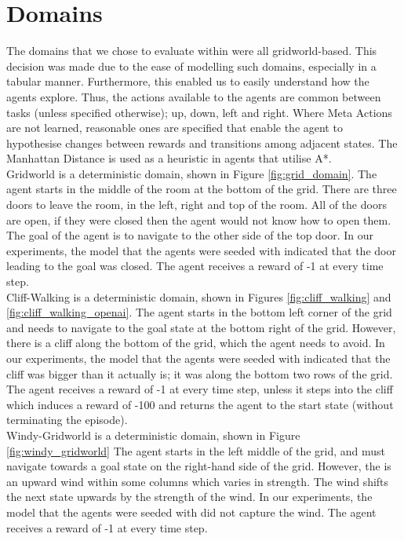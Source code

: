 \section{Domains}
The domains that we chose to evaluate within were all gridworld-based. This decision was made due to the ease of modelling such domains, especially in a tabular manner. Furthermore, this enabled us to easily understand how the agents explore. Thus, the actions available to the agents are common between tasks (unless specified otherwise); up, down, left and right. Where Meta Actions are not learned, reasonable ones are specified that enable the agent to hypothesise changes between rewards and transitions among adjacent states. The Manhattan Distance \cite{krause1973taxicab} is used as a heuristic in agents that utilise A*.
\\Gridworld is a deterministic domain, shown in Figure \ref{fig:grid_domain}. The agent starts in the middle of the room at the bottom of the grid. There are three doors to leave the room, in the left, right and top of the room. All of the doors are open, if they were closed then the agent would not know how to open them. The goal of the agent is to navigate to the other side of the top door. In our experiments, the model that the agents were seeded with indicated that the door leading to the goal was closed. The agent receives a reward of -1 at every time step.
\\Cliff-Walking \cite{Sutton1998} is a deterministic domain, shown in Figures \ref{fig:cliff_walking} and \ref{fig:cliff_walking_openai}. The agent starts in the bottom left corner of the grid and needs to navigate to the goal state at the bottom right of the grid. However, there is a cliff along the bottom of the grid, which the agent needs to avoid. In our experiments, the model that the agents were seeded with indicated that the cliff was bigger than it actually is; it was along the bottom two rows of the grid. The agent receives a reward of -1 at every time step, unless it steps into the cliff which induces a reward of -100 and returns the agent to the start state (without terminating the episode).
\\Windy-Gridworld \cite{Sutton1998} is a deterministic domain, shown in Figure \ref{fig:windy_gridworld} The agent starts in the left middle of the grid, and must navigate towards a goal state on the right-hand side of the grid. However, the is an upward wind within some columns which varies in strength. The wind shifts the next state upwards by the strength of the wind. In our experiments, the model that the agents were seeded with did not capture the wind. The agent receives a reward of -1 at every time step.
